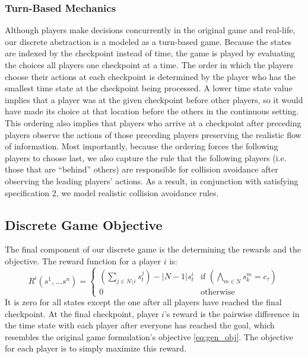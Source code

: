 \subsubsection{Turn-Based Mechanics}
Although players make decisions concurrently in the original game and real-life, our discrete abstraction is a modeled as a turn-based game. Because the states are indexed by the checkpoint instead of time, the game is played by evaluating the choices all players one checkpoint at a time. The order in which the players choose their actions at each checkpoint is determined by the player who has the smallest time state at the checkpoint being processed. A lower time state value implies that a player was at the given checkpoint before other players, so it would have made its choice at that location before the others in the continuous setting. This ordering also implies that players who arrive at a checkpoint after preceding players observe the actions of those preceding players preserving the realistic flow of information. Most importantly, because the ordering forces the following players to choose last, we also capture the rule that the following players (i.e. those that are ``behind'' others) are responsible for collision avoidance after observing the leading players' actions. As a result, in conjunction with satisfying specification 2, we model realistic collision avoidance rules. 

\subsection{Discrete Game Objective} \label{section:discobj}
The final component of our discrete game is the determining the rewards and the objective. The reward function for a player $i$ is: 
\begin{equation}
    R^i(s^1, ... s^n) = \begin{cases} 
                (\sum_{j \in N \setminus i} s^j_t) - |N-1|s^i_t & \text{if } (\bigwedge_{m \in N} s^m_k   = c_\tau) \\ 
                0    & \text{otherwise}
                \end{cases}
\end{equation}
It is zero for all states except the one after all players have reached the final checkpoint. At the final checkpoint, player $i$'s reward is the pairwise difference in the time state with each player after everyone has reached the goal, which resembles the original game formulation's objective \eqref{eq:gen_obj}. The objective for each player is to simply maximize this reward.

